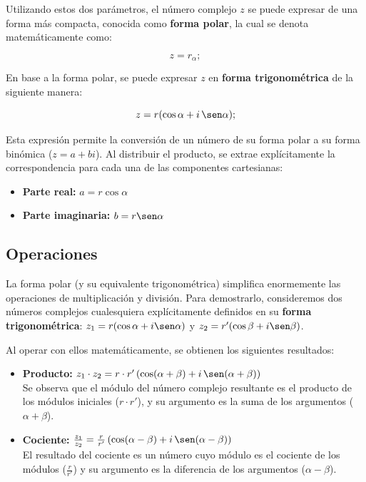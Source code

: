 Utilizando estos dos parámetros, el número complejo $z$ se puede expresar de una forma más compacta, conocida como \textbf{forma polar}, la cual se denota matemáticamente como:

\[
    z = r_{\alpha};
\]

En base a la forma polar, se puede expresar $z$ en \textbf{forma trigonométrica} de la siguiente manera:

\[
    z = r (\cos \alpha + i \, \sen \alpha);
\]

Esta expresión permite la conversión de un número de su forma polar a su forma binómica ($z = a + bi$). Al distribuir el producto, se extrae explícitamente la correspondencia para cada una de las componentes cartesianas:

\begin{itemize}
    \item \textbf{Parte real:} $a = r \cos \alpha$
    \item \textbf{Parte imaginaria:} $b = r \sen \alpha$
\end{itemize}

\subsection{Operaciones}

La forma polar (y su equivalente trigonométrica) simplifica enormemente las operaciones de multiplicación y división. Para demostrarlo, consideremos dos números complejos cualesquiera explícitamente definidos en su \textbf{forma trigonométrica}: $z_1 = r (\cos \alpha + i \sen \alpha)$ y $z_2 = r' (\cos \beta + i \sen \beta)$.

Al operar con ellos matemáticamente, se obtienen los siguientes resultados:

\begin{itemize}
    \item \textbf{Producto:} $z_1 \cdot z_2 = r \cdot r' \, (\cos(\alpha + \beta) + i \, \sen(\alpha + \beta))$\\
          Se observa que el módulo del número complejo resultante es el producto de los módulos iniciales ($r \cdot r'$), y su argumento es la suma de los argumentos ($\alpha + \beta$).

    \item \textbf{Cociente:} $\frac{z_1}{z_2} = \frac{r}{r'} \, (\cos(\alpha - \beta) + i \, \sen(\alpha - \beta))$\\
          El resultado del cociente es un número cuyo módulo es el cociente de los módulos ($\frac{r}{r'}$) y su argumento es la diferencia de los argumentos ($\alpha - \beta$).
\end{itemize}

